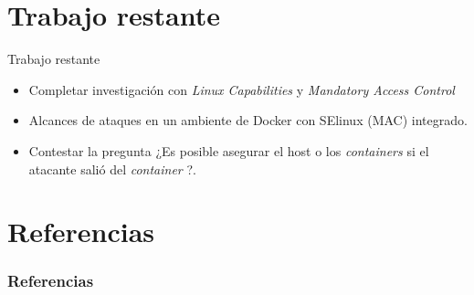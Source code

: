 \documentclass{bredelebeamer}
\newcommand{\container}{\textit{container }}
\newcommand{\containers}{\textit{containers }}
\begin{document}
\section{Trabajo restante}


\begin{frame}{Trabajo restante}
	\begin{itemize}
	\item Completar investigación con \emph{Linux Capabilities} y \emph{Mandatory Access Control}
	\item Alcances de ataques en un ambiente de Docker con SElinux (MAC) integrado.
	\item Contestar la pregunta ¿Es posible asegurar el host o los \containers  si el atacante salió del \container?.
\end{itemize}
\end{frame}

\section{Referencias}
\begin{frame}[allowframebreaks]
\frametitle{Referencias}


\end{frame}
\end{document}
